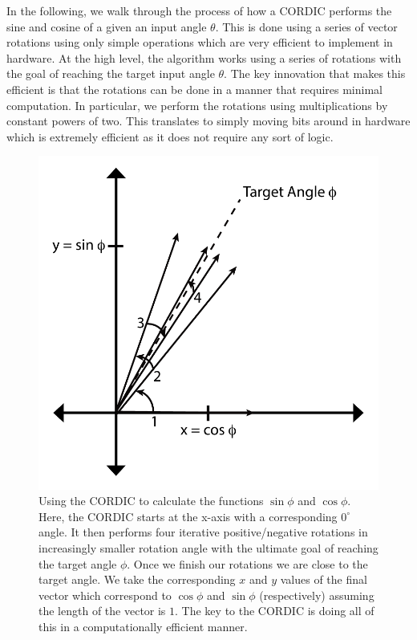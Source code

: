In the following, we walk through the process of how a CORDIC performs the sine and cosine of a given an input angle $\theta$. This is done using a series of vector rotations using only simple operations which are very efficient to implement in hardware. At the high level, the algorithm works using a series of rotations with the goal of reaching the target input angle $\theta$. The key innovation that makes this efficient is that the rotations can be done in a manner that requires minimal computation. In particular, we perform the rotations using multiplications by constant powers of two. This translates to simply moving bits around in hardware which is extremely efficient as it does not require any sort of logic.  

\begin{figure}
\centering
\includegraphics[width=.5\textwidth]{images/cordic_overview}
\caption{ Using the CORDIC to calculate the functions $\sin \phi$ and $\cos \phi$. Here, the CORDIC starts at the x-axis with a corresponding $0^\circ$ angle. It then performs four iterative positive/negative rotations in increasingly smaller rotation angle with the ultimate goal of reaching the target angle $\phi$. Once we finish our rotations we are close to the target angle. We take the corresponding $x$ and $y$ values of the final vector which correspond to  $\cos \phi$ and $\sin \phi$ (respectively) assuming the length of the vector is $1$. The key to the CORDIC is doing all of this in a computationally efficient manner. }
\label{fig:cordic_overview}
\end{figure}

